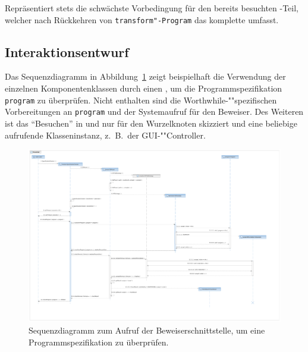 \begin{description}%

    Repräsentiert stets die schwächste Vorbedingung für den bereits
    besuchten -Teil, welcher nach Rückkehren von
    \texttt{transform"-Program} das komplette  umfasst.%

\end{description}%

\subsection{Interaktionsentwurf}%

Das Sequenzdiagramm in Abbildung~\ref{programchecking_sequencediagram}
zeigt beispielhaft die Verwendung der einzelnen Komponentenklassen
durch einen , um die
Programmspezifikation \texttt{program} zu überprüfen. Nicht enthalten
sind die Worthwhile-""spezifischen Vorbereitungen an \texttt{program}
und der Systemaufruf für den Beweiser. Des Weiteren ist das
"`Besuchen"' in  und  nur für
den Wurzelknoten skizziert und  eine beliebige aufrufende
Klasseninstanz, z.~B.\ der GUI-""Controller.%

\begin{landscape}%
    \begin{figure}[p]%
        \vspace{-2cm}%
        \includegraphics[height=1.2\textheight]{diagrams/programchecking_sequence.pdf}%

        \caption{Sequenzdiagramm zum Aufruf der Beweiserschnittstelle,
        um eine Programmspezifikation zu überprüfen.}%

        \label{programchecking_sequencediagram}%
    \end{figure}%
\end{landscape}%
